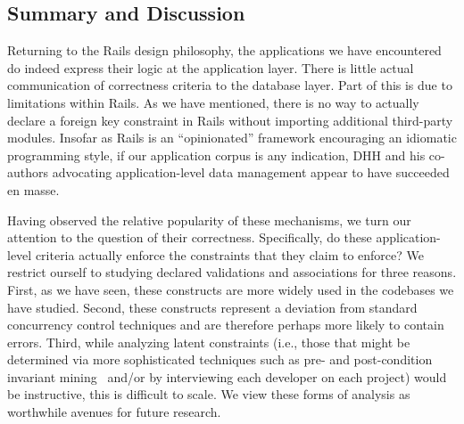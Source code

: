 \subsection{Summary and Discussion}

Returning to the Rails design philosophy, the applications we have
encountered do indeed express their logic at the application
layer. There is little actual communication of correctness criteria to
the database layer. Part of this is due to limitations within
Rails. As we have mentioned, there is no way to actually declare a
foreign key constraint in Rails without importing additional
third-party modules. Insofar as Rails is an ``opinionated'' framework
encouraging an idiomatic programming style, if our application corpus
is any indication, DHH and his co-authors advocating application-level
data management appear to have succeeded en masse.

Having observed the relative popularity of these mechanisms, we turn
our attention to the question of their correctness. Specifically, do
these application-level criteria actually enforce the constraints that
they claim to enforce? We restrict ourself to studying declared
validations and associations for three reasons. First, as we have
seen, these constructs are more widely used in the codebases we have
studied. Second, these constructs represent a deviation from standard
concurrency control techniques and are therefore perhaps more likely
to contain errors. Third, while analyzing latent constraints (i.e.,
those that might be determined via more sophisticated techniques such
as pre- and post-condition invariant
mining~\cite{writes-forest,redblue-new} and/or by interviewing each
developer on each project) would be instructive, this is difficult to
scale. We view these forms of analysis as worthwhile avenues for
future research.
